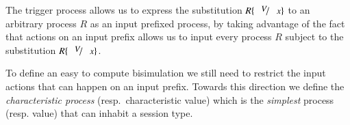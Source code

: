 %
%
The trigger process allows us to express the
substitution $R \subst{V}{x}$ to an arbitrary process
$R$ as an input prefixed process, by taking
advantage of the fact that actions on an input
prefix allows us to input every process $R$
subject to the substitution $R \subst{V}{x}$.

To define an easy to compute bisimulation we still need to
restrict the input actions that can happen on an input
prefix.
Towards this direction we define the
{\em characteristic process} (resp.~characteristic value)
which is the
{\em simplest} process (resp. value) that can inhabit 
a session type.


